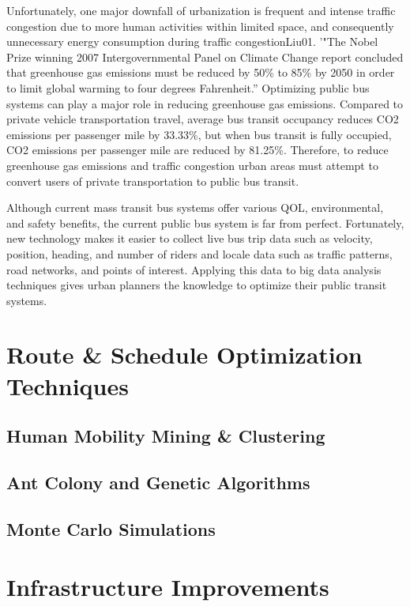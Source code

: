 \documentclass[sigconf]{acmart}
\begin{document}
Unfortunately, one major downfall of urbanization is frequent and intense traffic congestion due to more human activities within limited space, and consequently unnecessary energy consumption during traffic congestion{Liu01}. '"The Nobel Prize winning 2007 Intergovernmental Panel on Climate Change report concluded that greenhouse gas emissions must be reduced by 50\% to 85\% by 2050 in order to limit global warming to four degrees Fahrenheit\cite{Hodges01}.'' Optimizing public bus systems can play a major role in reducing greenhouse gas emissions. Compared to private vehicle transportation travel, average bus transit occupancy reduces CO2 emissions per passenger mile by 33.33\%, but when bus transit is fully occupied, CO2 emissions per passenger mile are reduced by 81.25\%\cite{Hodges01}. Therefore, to reduce greenhouse gas emissions and traffic congestion urban areas must attempt to convert users of private transportation to public bus transit. 

Although current mass transit bus systems offer various QOL, environmental, and safety benefits, the current public bus system is far from perfect. Fortunately, new technology makes it easier to collect live bus trip data such as velocity, position, heading, and number of riders and locale data such as traffic patterns, road networks, and points of interest. Applying this data to big data analysis techniques gives urban planners the knowledge to optimize their public transit systems. 



\section{Route \& Schedule Optimization Techniques}
\subsection{Human Mobility Mining \& Clustering}
\subsection{Ant Colony and Genetic Algorithms}
\subsection{Monte Carlo Simulations}

\section{Infrastructure Improvements}
\end{document}
